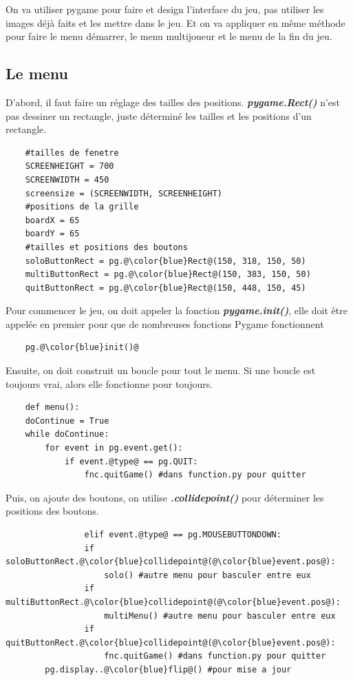 \documentclass[a4paper]{report}
\begin{document}
On va utiliser pygame pour faire et design l'interface du jeu, pas utiliser les images déjà faits et les mettre dans le jeu.
Et on va appliquer en même méthode pour faire le menu démarrer, le menu multijoueur et le menu de la fin du jeu.

\subsection{Le menu}
D'abord, il faut faire un réglage des tailles des positions. \textbf{\textit{pygame.Rect()}} n'est pas dessiner un rectangle, juste déterminé les tailles et les positions d'un rectangle.
\begin{lstlisting}
    #tailles de fenetre
    SCREENHEIGHT = 700
    SCREENWIDTH = 450
    screensize = (SCREENWIDTH, SCREENHEIGHT)
    #positions de la grille
    boardX = 65
    boardY = 65
    #tailles et positions des boutons
    soloButtonRect = pg.@\color{blue}Rect@(150, 318, 150, 50)
    multiButtonRect = pg.@\color{blue}Rect@(150, 383, 150, 50)
    quitButtonRect = pg.@\color{blue}Rect@(150, 448, 150, 45)
\end{lstlisting}

Pour commencer le jeu, on doit appeler la fonction \textbf{\textit{pygame.init()}}, elle doit être appelée en premier pour que de nombreuses fonctions Pygame fonctionnent
\begin{lstlisting}
    pg.@\color{blue}init()@
\end{lstlisting}

Ensuite, on doit construit un boucle pour tout le menu. Si une boucle est toujours vrai, alors elle fonctionne pour toujours.
\begin{lstlisting}
    def menu():
    doContinue = True
    while doContinue:
        for event in pg.event.get():
            if event.@type@ == pg.QUIT:
                fnc.quitGame() #dans function.py pour quitter
\end{lstlisting}

Puis, on ajoute des boutons, on utilise \textbf{\textit{.collidepoint()}} pour déterminer les positions des boutons.
\begin{lstlisting}
                elif event.@type@ == pg.MOUSEBUTTONDOWN:
                if soloButtonRect.@\color{blue}collidepoint@(@\color{blue}event.pos@):
                    solo() #autre menu pour basculer entre eux
                if multiButtonRect.@\color{blue}collidepoint@(@\color{blue}event.pos@):
                    multiMenu() #autre menu pour basculer entre eux
                if quitButtonRect.@\color{blue}collidepoint@(@\color{blue}event.pos@):
                    fnc.quitGame() #dans function.py pour quitter
        pg.display..@\color{blue}flip@() #pour mise a jour
\end{lstlisting}
\end{document}
